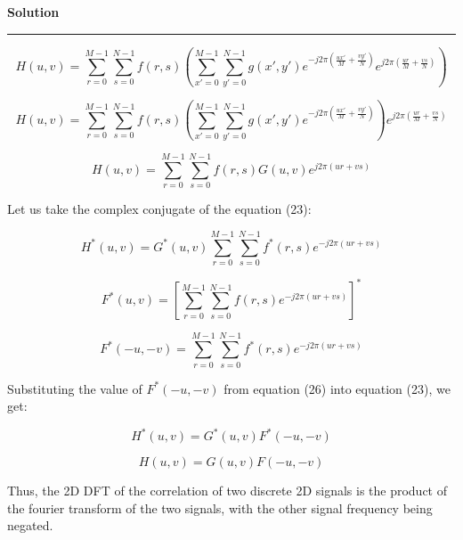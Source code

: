 \documentclass[a4paper]{article}
\newenvironment{solution}[2][]{%
    \begin{mdframed}[linecolor=green!60!black, linewidth=2pt, roundcorner=10pt, backgroundcolor=green!5!white, skipabove=12pt, skipbelow=12pt]%
        \textbf{\large #2} %
        \par\noindent\rule{\textwidth}{0.4pt} %
        \vspace{0.5em} %
}{%
    \end{mdframed}%
}
\begin{document}
\begin{solution}{Solution}
\begin{equation}
    H(u, v) = \sum_{r = 0}^{M-1} \sum_{s = 0}^{N-1} f(r, s)\left( \sum_{x' = 0}^{M-1} \sum_{y' = 0}^{N-1} g(x', y') e^{-j2\pi(\frac{ux'}{M}+\frac{vy'}{N})} e^{j2\pi(\frac{ur}{M}+\frac{vs}{N})}\right)
\end{equation}

\begin{equation}
    H(u, v) = \sum_{r = 0}^{M-1} \sum_{s = 0}^{N-1} f(r, s)\left( \sum_{x' = 0}^{M-1} \sum_{y' = 0}^{N-1} g(x', y') e^{-j2\pi(\frac{ux'}{M}+\frac{vy'}{N})}\right) e^{j2\pi(\frac{ur}{M}+\frac{vs}{N})}
\end{equation}

\begin{equation}
    H(u, v) = \sum_{r = 0}^{M-1} \sum_{s = 0}^{N-1} f(r, s) G(u,v) e^{j2\pi(ur+vs)}
\end{equation}


Let us take the complex conjugate of the equation (23):

\begin{equation}
    H^*(u, v) = G^*(u,v) \sum_{r = 0}^{M-1} \sum_{s = 0}^{N-1} f^*(r, s)  e^{-j2\pi(ur+vs)}
\end{equation}

\begin{equation}
    F^*(u, v) = [\sum_{r = 0}^{M-1} \sum_{s = 0}^{N-1} f(r, s)  e^{-j2\pi(ur+vs)}]^*
\end{equation}

\begin{equation}
    F^*(-u, -v) = \sum_{r = 0}^{M-1} \sum_{s = 0}^{N-1} f^*(r, s)  e^{-j2\pi(ur+vs)}
\end{equation}

Substituting the value of $F^*(-u, -v)$ from equation (26) into equation (23), we get:

\begin{equation}
    H^*(u, v) = G^*(u,v) F^*(-u, -v)
\end{equation}

\begin{equation}
    H(u, v) = G(u,v) F(-u, -v)
\end{equation}

Thus, the 2D DFT of the correlation of two discrete 2D signals is the product of the fourier transform of the two signals, with the other signal frequency being negated.

\end{solution}
\end{document}
